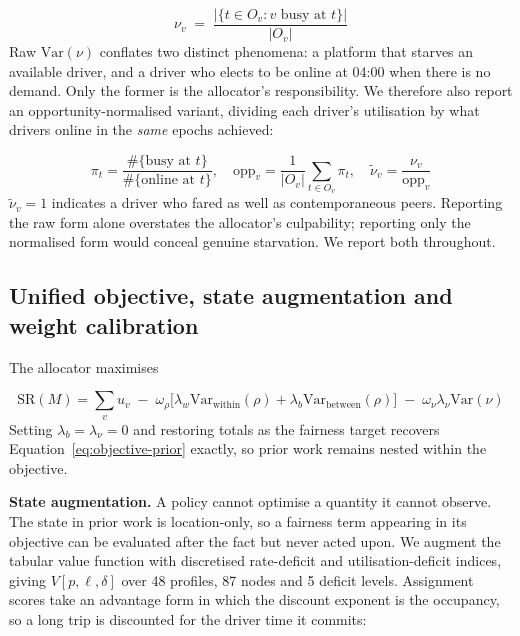 \documentclass[10pt,twocolumn]{article}
\begin{document}
\begin{equation}\label{eq:util}
\nu_v \;=\; \frac{\big|\{t \in O_v : v \text{ busy at } t\}\big|}{|O_v|}
\end{equation}
Raw \(\mathrm{Var}(\nu)\) conflates two distinct phenomena: a platform that starves an available driver, and a driver who elects to be online at 04:00 when there is no demand. Only the former is the allocator's responsibility. We therefore also report an opportunity-normalised variant, dividing each driver's utilisation by what drivers online in the \emph{same} epochs achieved:

\begin{equation}\label{eq:oppnorm}
\pi_t = \frac{\#\{\text{busy at } t\}}{\#\{\text{online at } t\}}, \quad \mathrm{opp}_v = \frac{1}{|O_v|}\sum_{t \in O_v} \pi_t, \quad \tilde{\nu}_v = \frac{\nu_v}{\mathrm{opp}_v}
\end{equation}
\(\tilde{\nu}_v = 1\) indicates a driver who fared as well as contemporaneous peers. Reporting the raw form alone overstates the allocator's culpability; reporting only the normalised form would conceal genuine starvation. We report both throughout.

\subsection{Unified objective, state augmentation and weight calibration}
The allocator maximises

\begin{equation}\label{eq:objective}
\mathrm{SR}(M) = \sum_{v} u_v \;-\; \omega_\rho\Big[\lambda_w \mathrm{Var}_{\mathrm{within}}(\rho) + \lambda_b \mathrm{Var}_{\mathrm{between}}(\rho)\Big] \;-\; \omega_\nu \lambda_\nu \mathrm{Var}(\nu)
\end{equation}
Setting \(\lambda_b = \lambda_\nu = 0\) and restoring totals as the fairness target recovers Equation~\ref{eq:objective-prior} exactly, so prior work remains nested within the objective.

\textbf{State augmentation.} A policy cannot optimise a quantity it cannot observe. The state in prior work is location-only, so a fairness term appearing in its objective can be evaluated after the fact but never acted upon. We augment the tabular value function with discretised rate-deficit and utilisation-deficit indices, giving \(V[p, \ell, \delta]\) over 48 profiles, 87 nodes and 5 deficit levels. Assignment scores take an advantage form in which the discount exponent is the occupancy, so a long trip is discounted for the driver time it commits:
\end{document}
